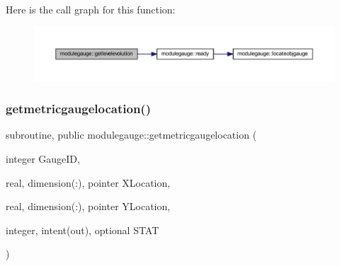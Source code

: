 Here is the call graph for this function\+:\nopagebreak
\begin{figure}[H]
\begin{center}
\leavevmode
\includegraphics[width=350pt]{namespacemodulegauge_aeb445b9f9d227121a220ceafb472ec2c_cgraph}
\end{center}
\end{figure}
\mbox{\label{namespacemodulegauge_af98cce9ae7ea92a6068724894d803842}} 
\subsubsection{\texorpdfstring{getmetricgaugelocation()}{getmetricgaugelocation()}}
{\footnotesize\ttfamily subroutine, public modulegauge\+::getmetricgaugelocation (\begin{DoxyParamCaption}\item[{integer}]{Gauge\+ID,  }\item[{real, dimension(\+:), pointer}]{X\+Location,  }\item[{real, dimension(\+:), pointer}]{Y\+Location,  }\item[{integer, intent(out), optional}]{S\+T\+AT }\end{DoxyParamCaption})}

